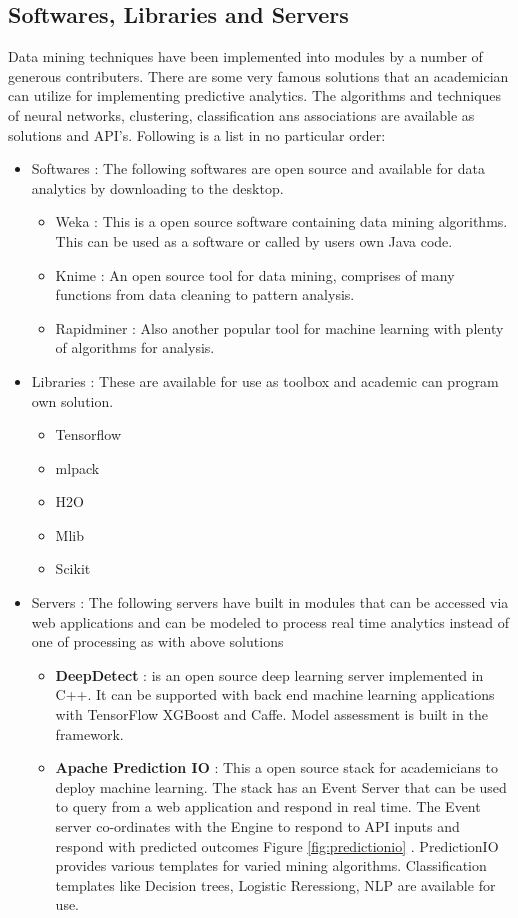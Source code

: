 \subsection{Softwares, Libraries and Servers} 
Data mining techniques have been implemented into modules by a number of generous  contributers. There are some very famous solutions that an academician can utilize for implementing predictive analytics. The algorithms and techniques of neural networks, clustering, classification ans associations are available as solutions and API's. Following is a list in no particular order:
\begin{itemize}
	\item Softwares : The following softwares are open source and available for data analytics by downloading to the desktop.
	\begin{itemize}
		\item Weka : This is a open source software containing data mining algorithms. This can be used as a software or called by users own Java code.
		\item Knime : An open source tool for data mining, comprises of many functions from data cleaning to pattern analysis.
		\item Rapidminer : Also another popular tool for machine learning with plenty of algorithms for analysis.
	\end{itemize}
	\item Libraries : These are available for use as toolbox and academic can program own solution.
	\begin{itemize}
		\item Tensorflow
		\item mlpack
		\item H2O
		\item Mlib
		\item Scikit
	\end{itemize}
	\item Servers : The following servers have built in modules that can be accessed via web applications and can be modeled to process real time analytics instead of one of processing as with above solutions
	\begin{itemize}
		\item \textbf{DeepDetect} : is an open source deep learning server implemented in C++. It can be supported with back end machine learning applications with TensorFlow XGBoost and Caffe. Model assessment is built in the framework.
		\item \textbf{Apache Prediction IO} : This a open source stack for academicians to deploy machine learning. The stack has an Event Server that can be used to query from a web application and respond in real time. The Event server co-ordinates with the Engine to respond to API inputs and respond with predicted outcomes Figure \ref{fig:predictionio} . PredictionIO provides various templates for varied mining algorithms. Classification templates like Decision trees, Logistic Reressiong, NLP are available for use.

\end{itemize}
\end{itemize}
